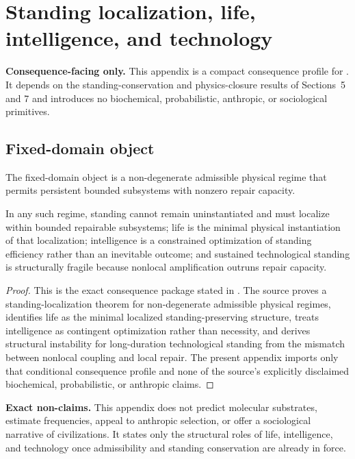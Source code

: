 \section{Standing localization, life, intelligence, and technology}
\label{app:life}

\begin{fixedbox}
\textbf{Consequence-facing only.} This appendix is a compact consequence profile for \lifedoc{}. It depends on the standing-conservation and physics-closure results of Sections~5 and 7 and introduces no biochemical, probabilistic, anthropic, or sociological primitives.
\end{fixedbox}

\subsection*{Fixed-domain object}
The fixed-domain object is a non-degenerate admissible physical regime that permits persistent bounded subsystems with nonzero repair capacity.

\begin{proposition}
In any such regime, standing cannot remain uninstantiated and must localize within bounded repairable subsystems; life is the minimal physical instantiation of that localization; intelligence is a constrained optimization of standing efficiency rather than an inevitable outcome; and sustained technological standing is structurally fragile because nonlocal amplification outruns repair capacity.
\end{proposition}

\begin{proof}
This is the exact consequence package stated in \lifedoc{}. The source proves a standing-localization theorem for non-degenerate admissible physical regimes, identifies life as the minimal localized standing-preserving structure, treats intelligence as contingent optimization rather than necessity, and derives structural instability for long-duration technological standing from the mismatch between nonlocal coupling and local repair. The present appendix imports only that conditional consequence profile and none of the source's explicitly disclaimed biochemical, probabilistic, or anthropic claims.\cite{MaleyStandingLocalizationLife}
\end{proof}

\begin{reviewbox}
\textbf{Exact non-claims.} This appendix does not predict molecular substrates, estimate frequencies, appeal to anthropic selection, or offer a sociological narrative of civilizations. It states only the structural roles of life, intelligence, and technology once admissibility and standing conservation are already in force.\cite{MaleyStandingLocalizationLife}
\end{reviewbox}
